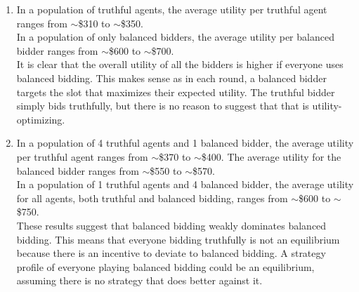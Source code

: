 \documentclass[12pt]{article}
\begin{document}
\begin{enumerate}[label=(\alph*)]
\item In a population of truthful agents, the average utility per truthful agent ranges from $\sim$\$310 to $\sim$\$350. \\

In a population of only balanced bidders, the average utility per balanced bidder ranges from $\sim$\$600 to $\sim$\$700. \\

It is clear that the overall utility of all the bidders is higher if everyone uses balanced bidding. This makes sense as in each round, a balanced bidder targets the slot that maximizes their expected utility. The truthful bidder simply bids truthfully, but there is no reason to suggest that that is utility-optimizing.

\item In a population of 4 truthful agents and 1 balanced bidder, the average utility per truthful agent ranges from $\sim$\$370 to $\sim$\$400. The average utility for the balanced bidder ranges from $\sim$\$550 to $\sim$\$570. \\

In a population of 1 truthful agents and 4 balanced bidder, the average utility for all agents, both truthful and balanced bidding, ranges from $\sim$\$600 to $\sim$\$750. \\

These results suggest that balanced bidding weakly dominates balanced bidding. This means that everyone bidding truthfully is not an equilibrium because there is an incentive to deviate to balanced bidding. A strategy profile of everyone playing balanced bidding could be an equilibrium, assuming there is no strategy that does better against it.

\end{enumerate}
\end{document}
